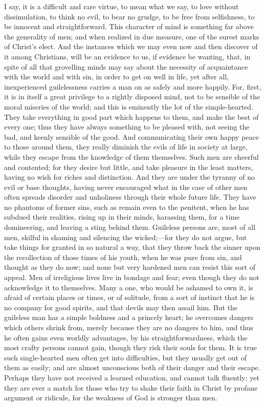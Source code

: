 I say, it is a difficult and rare virtue, to mean what we say, to
love without dissimulation, to think no evil, to bear no grudge, to be
free from selfishness, to be innocent and straightforward. This
character of mind is something far above the generality of men; and when
realized in due measure, one of the surest marks of Christ's elect. And
the instances which we may even now and then discover of it among
Christians, will be an evidence to us, if evidence be wanting, that, in
spite of all that grovelling minds may say about the necessity of
acquaintance with the world and with sin, in order to get on well in
life, yet after all, inexperienced guilelessness carries a man on as
safely and more happily. For, first, it is in itself a great privilege
to a rightly disposed mind, not to be sensible of the moral miseries of
the world; and this is eminently the lot of the simple-hearted. They
take everything in good part which happens to them, and make the best of
every one; thus they have always something to be pleased with, not
seeing the bad, and keenly sensible of the good. And communicating their
own happy peace to those around them, they really diminish the evils of
life in society at large, while they escape from the knowledge of them
themselves. Such men are cheerful and contented; for they desire but
little, and take pleasure in the least matters, having no wish for
riches and distinction. And they are under the tyranny of no evil or
base thoughts, having never encouraged what in the case of other men
often spreads disorder and unholiness through their whole future life.
They have no phantoms of former sins, such as remain even to the
penitent, when he has subdued their realities, rising up in their minds,
harassing them, for a time domineering, and leaving a sting behind them.
Guileless persons are, most of all men, skilful in shaming and silencing
the wicked;—for they do not argue, but take things for granted in so
natural a way, that they throw back the sinner upon the recollection of
those times of his youth, when he was pure from sin, and thought as they
do now; and none but very hardened men can resist this sort of appeal.
Men of irreligious lives live in bondage and fear; even though they do
not acknowledge it to themselves. Many a one, who would be ashamed to
own it, is afraid of certain places or times, or of solitude, from a
sort of instinct that he is no company for good spirits, and that devils
may then assail him. But the guileless man has a simple boldness and a
princely heart; he overcomes dangers which others shrink from, merely
because they are no dangers to him, and thus he often gains even worldly
advantages, by his straightforwardness, which the most crafty persons
cannot gain, though they risk their souls for them. It is true such
single-hearted men often get into difficulties, but they usually get out
of them as easily; and are almost unconscious both of their danger and
their escape. Perhaps they have not received a learned education, and
cannot talk fluently; yet they are ever a match for those who try to
shake their faith in Christ by profane argument or ridicule, for the
weakness of God is stronger than men.


